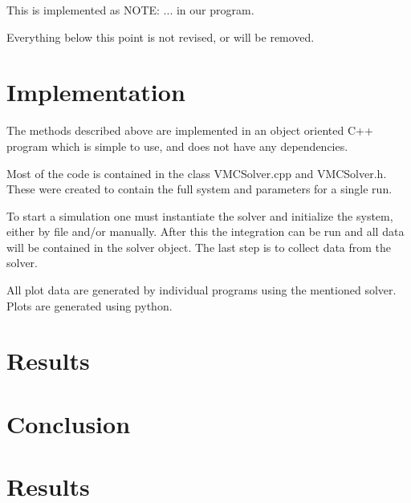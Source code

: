 \documentclass[twocolumns, a4paper,11pt,fleqn]{extarticle}
\begin{document}
This is implemented as NOTE: ... in our program. 













\clearpage








{\Huge Everything below this point is not revised, or will be removed.}

\section{Implementation}
The methods described above are implemented in an object oriented C++ program
which is simple to use, and does not have any dependencies. 

Most of the code is contained in the class VMCSolver.cpp and VMCSolver.h. 
These were created to contain the full system and parameters for a single run. 

To start a simulation one must instantiate the solver and 
initialize the system, either by file and/or manually. After this
the integration can be run and all data will be contained in the solver object.
The last step is to collect data from the solver. 

All plot data are generated by individual programs using the mentioned solver. 
Plots are generated using python. 

\section{Results}
\section{Conclusion}
\section{Results}
\end{document}
